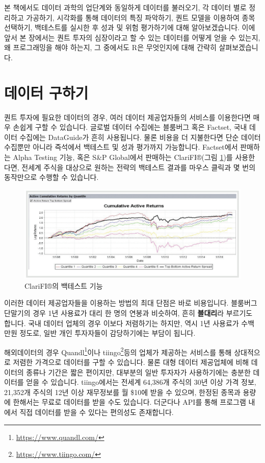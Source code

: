 \documentclass[12pt,]{book}
\let\rmarkdownfootnote\footnote%
\def\footnote{\protect\rmarkdownfootnote}
\begin{document}
본 책에서도 데이터 과학의 업단계와 동일하게 데이터를 불러오기, 각 데이터 별로 정리하고 가공하기, 시각화를 통해 데이터의 특징 파악하기, 퀀트 모델을 이용하여 종목 선택하기, 백테스트를 실시한 후 성과 및 위험 평가하기에 대해 알아보겠습니다. 이에 앞서 본 장에서는 퀀트 투자의 심장이라고 할 수 있는 데이터를 어떻게 얻을 수 있는지, 왜 프로그래밍을 해야 하는지, 그 중에서도 R은 무엇인지에 대해 간략히 살펴보겠습니다.

\hypertarget{section-2}{%
\section{데이터 구하기}\label{section-2}}

퀀트 투자에 필요한 데이터의 경우, 여러 데이터 제공업자들의 서비스를 이용한다면 매우 손쉽게 구할 수 있습니다. 글로벌 데이터 수집에는 블룸버그 혹은 Factset, 국내 데이터 수집에는 DataGuide가 흔히 사용됩니다. 물론 비용을 더 지불한다면 단순 데이터 수집뿐만 아니라 즉석에서 백테스트 및 성과 평가까지 가능합니다. Factset에서 판매하는 Alpha Testing 기능, 혹은 S\&P Global에서 판매하는 ClariFI®(그림 \ref{fig:clarifi})를 사용한다면, 전세계 주식을 대상으로 원하는 전략의 백테스트 결과를 마우스 클릭과 몇 번의 동작만으로 수행할 수 있습니다.

\begin{figure}[h]

{\centering \includegraphics[width=0.7\linewidth]{images/ClariFI_backtest} 

}

\caption{ClariFI®의 백테스트 기능}\label{fig:clarifi}
\end{figure}

이러한 데이터 제공업자들을 이용하는 방법의 최대 단점은 바로 비용입니다. 블룸버그 단말기의 경우 1년 사용료가 대리 한 명의 연봉과 비슷하여, 흔히 \textbf{블대리}라 부르기도 합니다. 국내 데이터 업체의 경우 이보다 저렴하기는 하지만, 역시 1년 사용료가 수백 만원 정도로, 일반 개인 투자자들이 감당하기에는 부담이 됩니다.

해외데이터의 경우 Quandl\footnote{\url{https://www.quandl.com/}}이나 tiingo\footnote{\url{https://www.tiingo.com/}}등의 업체가 제공하는 서비스를 통해 상대적으로 저렴한 가격으로 데이터를 구할 수 있습니다. 물론 대형 데이터 제공업체에 비해 데이터의 종류나 기간은 짧은 편이지만, 대부분의 일반 투자자가 사용하기에는 충분한 데이터를 얻을 수 있습니다. tiingo에서는 전세계 64,386개 주식의 30년 이상 가격 정보, 21,352개 주식의 12년 이상 재무정보를 월 \$10에 받을 수 있으며, 한정된 종목과 용량에 한해서는 무료로 데이터를 받을 수도 있습니다. 더군다나 API를 통해 프로그램 내에서 직접 데이터를 받을 수 있다는 편의성도 존재합니다.
\end{document}

